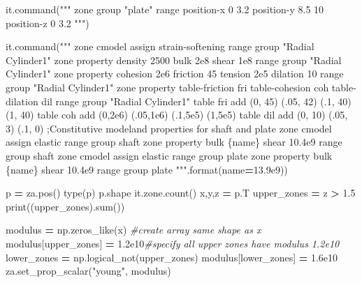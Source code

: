 \documentclass[a4paper, nobind]{templates/ociamthesis}
\newenvironment{Shaded}{\begin{snugshade}}{\end{snugshade}}
\newcommand{\BuiltInTok}[1]{#1}
\newcommand{\CommentTok}[1]{\textcolor[rgb]{0.56,0.35,0.01}{\textit{#1}}}
\newcommand{\FloatTok}[1]{\textcolor[rgb]{0.00,0.00,0.81}{#1}}
\newcommand{\NormalTok}[1]{#1}
\newcommand{\OperatorTok}[1]{\textcolor[rgb]{0.81,0.36,0.00}{\textbf{#1}}}
\newcommand{\SpecialCharTok}[1]{\textcolor[rgb]{0.00,0.00,0.00}{#1}}
\newcommand{\StringTok}[1]{\textcolor[rgb]{0.31,0.60,0.02}{#1}}
\renewenvironment{Shaded}
{
  \vspace{10pt}%
  \begin{snugshade}%
}{%
  \end{snugshade}%
  \vspace{8pt}%
}
\begin{document}
\begin{Shaded}
\begin{Highlighting}[]
\NormalTok{it.command(}\StringTok{"""}
\StringTok{zone group "plate" range position{-}x 0 3.2 position{-}y 8.5 10 position{-}z 0 3.2}
\StringTok{"""}\NormalTok{)}

\NormalTok{it.command(}\StringTok{"""}
\StringTok{zone cmodel assign strain{-}softening range group "Radial Cylinder1"}
\StringTok{zone property density 2500 bulk 2e8 shear 1e8 range group "Radial Cylinder1"}
\StringTok{zone property cohesion 2e6 friction 45 tension 2e5 dilation 10 range group "Radial Cylinder1"}
\StringTok{zone property table{-}friction \textquotesingle{}fri\textquotesingle{} table{-}cohesion \textquotesingle{}coh\textquotesingle{} table{-}dilation \textquotesingle{}dil\textquotesingle{} range group "Radial Cylinder1"}
\StringTok{table \textquotesingle{}fri\textquotesingle{} add (0, 45) (.05, 42) (.1, 40) (1, 40)}
\StringTok{table \textquotesingle{}coh\textquotesingle{} add (0,2e6) (.05,1e6) (.1,5e5) (1,5e5) }
\StringTok{table \textquotesingle{}dil\textquotesingle{} add (0, 10) (.05,  3) (.1,  0) }
\StringTok{;Constitutive modeland properties for shaft and plate}
\StringTok{zone cmodel assign elastic range group \textquotesingle{}shaft\textquotesingle{}}
\StringTok{zone property bulk }\SpecialCharTok{\{name\}}\StringTok{  shear 10.4e9  range group \textquotesingle{}shaft\textquotesingle{}}
\StringTok{zone cmodel assign elastic range group \textquotesingle{}plate\textquotesingle{}}
\StringTok{zone property bulk }\SpecialCharTok{\{name\}}\StringTok{  shear 10.4e9  range group \textquotesingle{}plate\textquotesingle{}}
\StringTok{"""}\NormalTok{.}\BuiltInTok{format}\NormalTok{(name}\OperatorTok{=}\FloatTok{13.9e9}\NormalTok{))}


\NormalTok{p }\OperatorTok{=}\NormalTok{ za.pos()}
\BuiltInTok{type}\NormalTok{(p)}
\NormalTok{p.shape}
\NormalTok{it.zone.count()}
\NormalTok{x,y,z }\OperatorTok{=}\NormalTok{ p.T}
\NormalTok{upper\_zones }\OperatorTok{=}\NormalTok{ z }\OperatorTok{\textgreater{}} \FloatTok{1.5}
\BuiltInTok{print}\NormalTok{((upper\_zones).}\BuiltInTok{sum}\NormalTok{())}

\NormalTok{modulus }\OperatorTok{=}\NormalTok{ np.zeros\_like(x) }\CommentTok{\#create array same shape as x}
\NormalTok{modulus[upper\_zones] }\OperatorTok{=} \FloatTok{1.2e10}\CommentTok{\#specify all upper zones have modulus 1.2e10}
\NormalTok{lower\_zones }\OperatorTok{=}\NormalTok{ np.logical\_not(upper\_zones)}
\NormalTok{modulus[lower\_zones] }\OperatorTok{=} \FloatTok{1.6e10}
\NormalTok{za.set\_prop\_scalar(}\StringTok{"young"}\NormalTok{, modulus)}


\end{Highlighting}
\end{Shaded}
\end{document}
